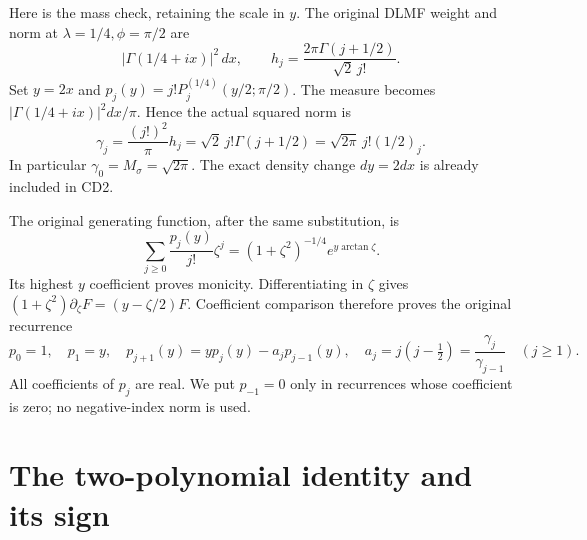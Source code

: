 \documentclass[11pt]{article}
\begin{document}
Here is the mass check, retaining the scale in \(y\). The original DLMF
weight and norm at \(\lambda=1/4,\phi=\pi/2\) are
\[
 |\Gamma(1/4+ix)|^2\,dx,
 \qquad
 h_j=\frac{2\pi\Gamma(j+1/2)}{\sqrt2\,j!}.
\]
Set \(y=2x\) and
\(p_j(y)=j!P_j^{(1/4)}(y/2;\pi/2)\).
The measure becomes \(|\Gamma(1/4+ix)|^2dx/\pi\). Hence the actual
squared norm is
\begin{equation}\label{eq:norm}
 \gamma_j=\frac{(j!)^2}{\pi}h_j
 =\sqrt2\,j!\Gamma(j+1/2)
 =\sqrt{2\pi}\,j!(1/2)_j.
 \tag{CD2}
\end{equation}
In particular \(\gamma_0=M_\sigma=\sqrt{2\pi}\). The exact density
change \(dy=2dx\) is already included in CD2.

The original generating function, after the same substitution, is
\[
 \sum_{j\geq0}\frac{p_j(y)}{j!}\zeta^j
 =(1+\zeta^2)^{-1/4}e^{y\arctan\zeta}.
\]
Its highest \(y\) coefficient proves monicity. Differentiating in
\(\zeta\) gives
\((1+\zeta^2)\partial_\zeta F=(y-\zeta/2)F\).
Coefficient comparison therefore proves the original recurrence
\begin{equation}\label{eq:recurrence}
 p_0=1,\quad p_1=y,\quad
 p_{j+1}(y)=yp_j(y)-a_jp_{j-1}(y),
 \quad a_j=j(j-\tfrac12)=\frac{\gamma_j}{\gamma_{j-1}}
 \quad(j\geq1).
 \tag{CD3}
\end{equation}
All coefficients of \(p_j\) are real. We put \(p_{-1}=0\) only in
recurrences whose coefficient is zero; no negative-index norm is used.

\section{The two-polynomial identity and its sign}
\end{document}
